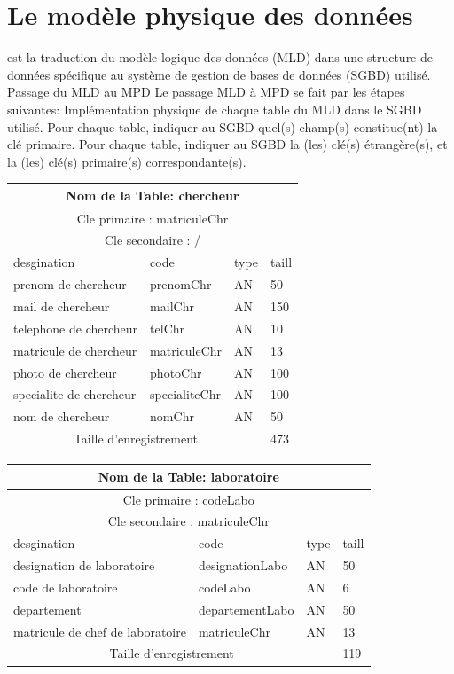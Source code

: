 \section{Le modèle physique des données}
est la traduction du modèle logique des données (MLD) dans une structure de
données spécifique au système de gestion de bases de données (SGBD) utilisé.
Passage du MLD au MPD
Le passage MLD à MPD se fait par les étapes suivantes:
Implémentation physique de chaque table du MLD dans le SGBD utilisé.
Pour chaque table, indiquer au SGBD quel(s) champ(s) constitue(nt) la clé
primaire.
Pour chaque table, indiquer au SGBD la (les) clé(s) étrangère(s), et la (les)
clé(s) primaire(s) correspondante(s).


\vspace{2cm}
\begin{tabular}{ |p{5cm}||p{4cm}|p{3cm}|p{3cm}|  }
    \hline
    \multicolumn{4}{|c|}{Nom de la Table: chercheur} \\
    \hline
    \multicolumn{4}{|c|}{Cle primaire : matriculeChr} \\
    \hline
    \multicolumn{4}{|c|}{Cle secondaire : / } \\
    \hline
    \hline
    desgination&code&type&taill \\
    \hline
    prenom de chercheur&prenomChr&AN&50 \\
    mail de chercheur&mailChr&AN&150 \\
    telephone de chercheur&telChr&AN&10 \\
    matricule de chercheur&matriculeChr&AN&13 \\
    photo de chercheur&photoChr&AN&100 \\
    specialite de chercheur&specialiteChr&AN&100 \\
    nom de chercheur&nomChr&AN&50 \\
    \hline
    \hline
    \multicolumn{3}{|c|}{Taille d’enregistrement} & 473\\
    \hline
\end{tabular}

\vspace{2cm}

\begin{tabular}{ |p{5cm}||p{4cm}|p{3cm}|p{3cm}|  }
    \hline
    \multicolumn{4}{|c|}{Nom de la Table: laboratoire} \\
    \hline
    \multicolumn{4}{|c|}{Cle primaire : codeLabo} \\
    \hline
    \multicolumn{4}{|c|}{Cle secondaire : matriculeChr } \\
    \hline
    \hline
    desgination&code&type&taill \\
    \hline
    designation de laboratoire&designationLabo&AN&50 \\
    code de laboratoire&codeLabo&AN&6 \\
    departement&departementLabo&AN&50 \\
    matricule de chef de laboratoire&matriculeChr&AN&13 \\
    \hline
    \hline
    \multicolumn{3}{|c|}{Taille d’enregistrement} & 119\\
    \hline
\end{tabular}

